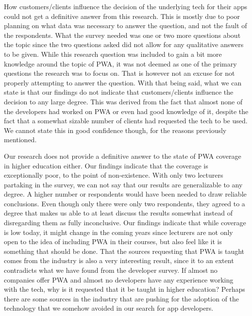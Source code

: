 \documentclass[a4paper,12pt]{article}
\begin{document}
How customers/clients influence the decision of the underlying tech for their apps could not get a definitive answer from this research. This is mostly due to poor planning on what data was necessary to answer the question, and not the fault of the respondents. What the survey needed was one or two more questions about the topic since the two questions asked did not allow for any qualitative answers to be given. While this research question was included to gain a bit more knowledge around the topic of PWA, it was not deemed as one of the primary questions the research was to focus on. That is however not an excuse for not properly attempting to answer the question. With that being said, what we can state is that our findings do not indicate that customers/clients influence the decision to any large degree. This was derived from the fact that almost none of the developers had worked on PWA or even had good knowledge of it, despite the fact that a somewhat sizable number of clients had requested the tech to be used. We cannot state this in good confidence though, for the reasons previously mentioned.

Our research does not provide a definitive answer to the state of PWA coverage in higher education either. Our findings indicate that the coverage is exceptionally poor, to the point of non-existence. With only two lecturers partaking in the survey, we can not say that our results are generalizable to any degree. A higher number or respondents would have been needed to draw reliable conclusions. Even though only there were only two respondents, they agreed to a degree that makes us able to at least discuss the results somewhat instead of disregarding them as fully inconclusive. Our findings indicate that while coverage is low today, it might change in the coming years since lecturers are not only open to the idea of including PWA in their courses, but also feel like it is something that should be done. That the sources requesting that PWA is taught comes from the industry is also a very interesting result, since it to an extent contradicts what we have found from the developer survey. If almost no companies offer PWA and almost no developers have any experience working with the tech, why is it requested that it be taught in higher education? Perhaps there are some sources in the industry that are pushing for the adoption of the technology that we somehow avoided in our search for app developers.
\end{document}
